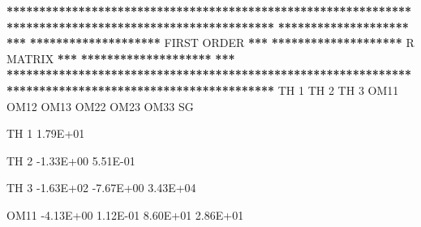 \documentclass[
  11pt,
  krantz2,
  a4paper]{krantz}
\newenvironment{Shaded}{\begin{snugshade}}{\end{snugshade}}
\newcommand{\DecValTok}[1]{\textcolor[rgb]{0.00,0.00,0.81}{#1}}
\newcommand{\ErrorTok}[1]{\textcolor[rgb]{0.64,0.00,0.00}{\textbf{#1}}}
\newcommand{\FloatTok}[1]{\textcolor[rgb]{0.00,0.00,0.81}{#1}}
\newcommand{\NormalTok}[1]{#1}
\newcommand{\OperatorTok}[1]{\textcolor[rgb]{0.81,0.36,0.00}{\textbf{#1}}}
\newcommand{\StringTok}[1]{\textcolor[rgb]{0.31,0.60,0.02}{#1}}
\theoremstyle{definition}
\theoremstyle{definition}
\theoremstyle{definition}
\theoremstyle{remark}
\begin{document}
\begin{Shaded}
\begin{Highlighting}[]
                                                                                                       
\OperatorTok{**}\ErrorTok{*****************************************************************************************************}
\ErrorTok{********************}\StringTok{                                                                                }\ErrorTok{***}
\ErrorTok{********************}\StringTok{                                   }\NormalTok{FIRST ORDER                                  }\OperatorTok{**}\ErrorTok{*}
\ErrorTok{********************}\StringTok{                                     }\NormalTok{R MATRIX                                   }\OperatorTok{**}\ErrorTok{*}
\ErrorTok{********************}\StringTok{                                                                                }\ErrorTok{***}
\ErrorTok{*******************************************************************************************************}
\StringTok{                                                                                                       }
\StringTok{                                                                                                       }
\StringTok{           }\NormalTok{TH }\DecValTok{1}\NormalTok{      TH }\DecValTok{2}\NormalTok{      TH }\DecValTok{3}\NormalTok{      OM11      OM12      OM13      OM22      OM23      OM33      SG}
                                                                                                       
                                                                                                       
\NormalTok{TH }\DecValTok{1}    \FloatTok{1.79E+01}                                                                                       
                                                                                                       
\NormalTok{TH }\DecValTok{2}   \FloatTok{{-}1.33E+00}  \FloatTok{5.51E{-}01}                                                                             
                                                                                                       
\NormalTok{TH }\DecValTok{3}   \FloatTok{{-}1.63E+02} \FloatTok{{-}7.67E+00}  \FloatTok{3.43E+04}                                                                   
                                                                                                       
\NormalTok{OM11   }\FloatTok{{-}4.13E+00}  \FloatTok{1.12E{-}01}  \FloatTok{8.60E+01}  \FloatTok{2.86E+01}                                                         
                                                                                                       

\end{Highlighting}
\end{Shaded}
\end{document}
